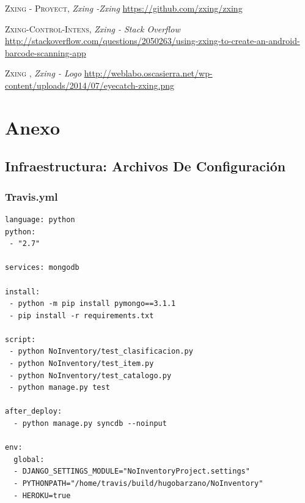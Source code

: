 \documentclass[a4paper,11pt]{book}
\begin{document}
\begin{thebibliography}{aaaa}
 \textsc{ Zxing - Proyect},
\textit{Zxing -Zxing}
\url{https://github.com/zxing/zxing}

 \textsc{ Zxing-Control-Intens},
\textit{Zxing - Stack Overflow}
\url{http://stackoverflow.com/questions/2050263/using-zxing-to-create-an-android-barcode-scanning-app}


 \textsc{ Zxing },
\textit{Zxing - Logo}
\url{http://weblabo.oscasierra.net/wp-content/uploads/2014/07/eyecatch-zxing.png}

\end{thebibliography}
 

\chapter{Anexo}
\section{Infraestructura: Archivos De Configuración}
\subsection{Travis.yml}\label{sec:travis}
\begin{lstlisting}
language: python
python:
 - "2.7"

services: mongodb

install:
 - python -m pip install pymongo==3.1.1
 - pip install -r requirements.txt

script:
 - python NoInventory/test_clasificacion.py
 - python NoInventory/test_item.py
 - python NoInventory/test_catalogo.py
 - python manage.py test
 
after_deploy:
  - python manage.py syncdb --noinput

env:
  global:
  - DJANGO_SETTINGS_MODULE="NoInventoryProject.settings"
  - PYTHONPATH="/home/travis/build/hugobarzano/NoInventory"
  - HEROKU=true

\end{lstlisting}
\end{document}
